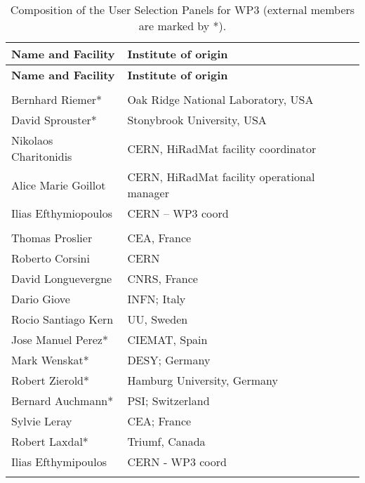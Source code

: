 
\begin{longtable}{|L{0.48\textwidth}|C{0.48\textwidth}|}
\caption{Composition of the User Selection Panels for WP3 (external members are marked by *).}
\label{tab:usp-wp3}
    \\ \hline
    {\bf Name and Facility} & {\bf Institute of origin} \\ \hline
    \endfirsthead
    \hline
    {\bf Name and Facility} & {\bf Institute of origin} \\ \hline
    \endhead
    \hline
    \endfoot

      \\ \hline
    Bernhard Riemer*	& Oak Ridge National Laboratory, USA  \\ \hline
     David Sprouster*	&Stonybrook University, USA  \\ \hline
    Nikolaos Charitonidis	&CERN, HiRadMat facility coordinator  \\ \hline 
    Alice Marie Goillot	& CERN, HiRadMat facility operational manager  \\ \hline
    Ilias Efthymiopoulos	& CERN – WP3 coord  \\ \hline
     \\ \hline
    Thomas Proslier	& CEA, France  \\ \hline
    Roberto Corsini	& CERN  \\ \hline
    David Longuevergne	& CNRS, France  \\ \hline
    Dario Giove	& INFN; Italy  \\ \hline
    Rocio Santiago Kern	& UU, Sweden  \\ \hline
    Jose Manuel Perez*	& CIEMAT, Spain  \\ \hline
    Mark Wenskat*	& DESY; Germany  \\ \hline
    Robert Zierold*	& Hamburg University, Germany  \\ \hline
    Bernard Auchmann*	& PSI; Switzerland  \\ \hline
    Sylvie Leray	& CEA; France  \\ \hline
    Robert Laxdal*	& Triumf, Canada  \\ \hline
    Ilias Efthymipoulos	& CERN - WP3 coord  \\ \hline
     \\ \hline

\end{longtable}
